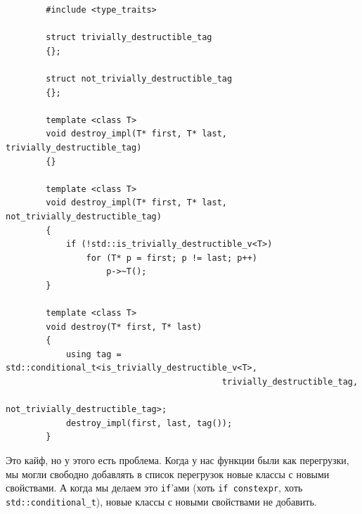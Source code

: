 \documentclass{article}
\begin{document}
    \begin{verbatim}
        #include <type_traits>

        struct trivially_destructible_tag
        {};

        struct not_trivially_destructible_tag
        {};

        template <class T>
        void destroy_impl(T* first, T* last, trivially_destructible_tag)
        {}

        template <class T>
        void destroy_impl(T* first, T* last, not_trivially_destructible_tag)
        {
            if (!std::is_trivially_destructible_v<T>)
                for (T* p = first; p != last; p++)
                    p->~T();
        }

        template <class T>
        void destroy(T* first, T* last)
        {
            using tag = std::conditional_t<is_trivially_destructible_v<T>,
                                           trivially_destructible_tag,
                                           not_trivially_destructible_tag>;
            destroy_impl(first, last, tag());
        }
    \end{verbatim}
    Это кайф, но у этого есть проблема. Когда у нас функции были как перегрузки, мы могли свободно добавлять в список перегрузок новые классы с новыми свойствами. А когда мы делаем это \texttt{if}'ами (хоть \texttt{if constexpr}, хоть \texttt{std::conditional_t}), новые классы с новыми свойствами не добавить.
\end{document}
